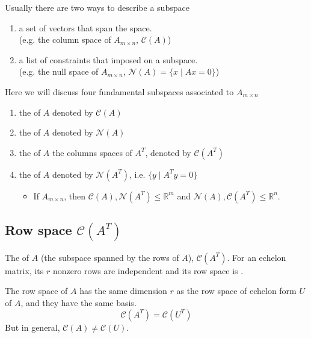 Usually there are two ways to describe a subspace
\begin{enumerate}[label=(\roman*)]
    \item a set of vectors that span the space. \\
    (e.g. the column space of $A_{m \times n}$, $\mathcal{C}(A)$)
    \item a list of constraints that imposed on a subspace. \\
    (e.g. the null space of $A_{m \times n}$, $\mathcal{N}(A) = \{x \mid Ax = 0\}$)
\end{enumerate}
Here we will discuss four fundamental subspaces associated to $A_{m \times n}$
\begin{enumerate}[label=(\arabic*)]
    \item the  of $A$ denoted by $\mathcal{C}(A)$
    \item the  of $A$ denoted by $\mathcal{N}(A)$
    \item the  of $A$ the columns spaces of $A^T$, denoted by $\mathcal{C}(A^T)$
    \item the  of $A$ denoted by $\mathcal{N}(A^T)$, i.e. $\{y \mid A^T y = 0\}$
    \begin{itemize}
        \item If $A_{m\times n}$, then $\mathcal{C}(A), \mathcal{N}(A^T) \leq \mathbb{R}^m$ and $\mathcal{N}(A), \mathcal{C}(A^T) \leq \mathbb{R}^n$.
    \end{itemize}
\end{enumerate}

\subsection{Row space $\mathcal{C}(A^T)$}

The  of $A$ (the subspace spanned by the rows of $A$), $\mathcal{C}(A^T)$. For an echelon matrix, its $r$ nonzero rows are independent and its row space is .

\begin{proposition}[2M]
    The row space of $A$ has the same dimension $r$ as the row space of echelon form $U$ of $A$, and they have the same basis.
    \[
        \mathcal{C}(A^T) = \mathcal{C}(U^T)
    \]
    But in general, $\mathcal{C}(A) \neq \mathcal{C}(U)$.
\end{proposition}

\newpage